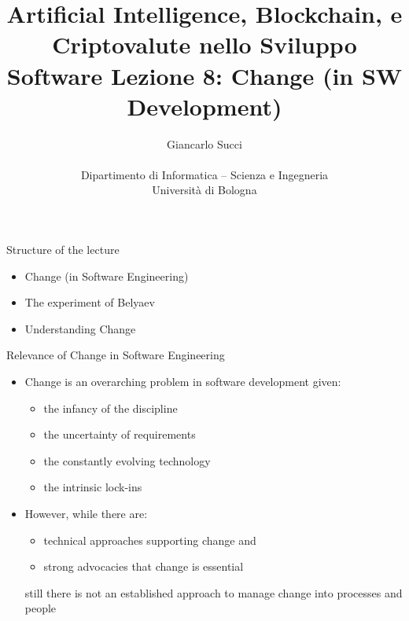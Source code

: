\documentclass{beamer}
\title[L07]{Artificial Intelligence, Blockchain, e Criptovalute nello Sviluppo Software \newline\newline
Lezione 8: Change (in SW Development)} %
\author[{\tiny Giancarlo Succi }]{Giancarlo Succi\\\\ Dipartimento di Informatica -- Scienza e Ingegneria\\Universit\`{a} di Bologna\\
\bftt{g.succi@unibo.it}
} %
\institute[unibo] %
\date{} %
\begin{document}
\begin{frame}
\titlepage %

\end{frame}





\begin{frame}
{\centerline{Structure of the lecture}}
\begin{itemize}
    \item Change (in Software Engineering)
    \item The experiment of Belyaev
    \item Understanding Change
    \end{itemize}
\end{frame}

\begin{frame}
{\centerline{Relevance of Change in Software Engineering}}
 
\begin{itemize}
\item Change is an overarching problem in software development given:
\begin{itemize}
\item the infancy of the discipline
\item the uncertainty of requirements
\item the constantly evolving technology
\item the intrinsic lock-ins
\end{itemize} 
\item However, while there are:
\begin{itemize}
\item technical approaches supporting change and
\item strong advocacies that change is essential
\end{itemize} 
still there is not an established approach to manage change into processes and people
\end{itemize} 

\end{frame}
\end{document}
